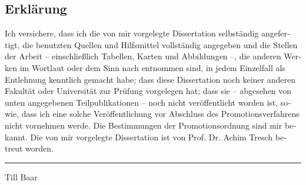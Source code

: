 \begin{otherlanguage}{german}

\chapter*{Erkl\"arung}

Ich versichere, dass ich die von mir vorgelegte Dissertation selbst\"andig
angefertigt, die benutzten Quellen und Hilfsmittel vollst\"andig angegeben und
die Stellen der Arbeit -- einschlie\ss{}lich Tabellen, Karten und Abbildungen
--, die anderen Werken im Wortlaut oder dem Sinn nach entnommen sind, in jedem
Einzelfall als Entlehnung kenntlich gemacht habe; dass diese Dissertation noch
keiner anderen Fakult\"at oder Universit\"at zur Pr\"ufung vorgelegen hat; dass
sie -- abgesehen von unten angegebenen Teilpublikationen -- noch nicht
ver\"offentlicht worden ist, sowie, dass ich eine solche Ver\"offentlichung vor
Abschluss des Promotionsverfahrens nicht vornehmen werde. Die Bestimmungen der
Promotionsordnung sind mir bekannt. Die von mir vorgelegte Dissertation ist von
Prof. Dr. Achim Tresch betreut worden.

\vspace{5\baselineskip}
\hrule
\vspace{\dp\strutbox}

Till Baar

\end{otherlanguage}